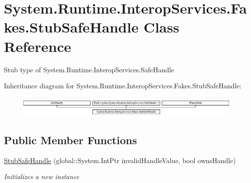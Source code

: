 \hypertarget{class_system_1_1_runtime_1_1_interop_services_1_1_fakes_1_1_stub_safe_handle}{\section{System.\-Runtime.\-Interop\-Services.\-Fakes.\-Stub\-Safe\-Handle Class Reference}
\label{class_system_1_1_runtime_1_1_interop_services_1_1_fakes_1_1_stub_safe_handle}
}


Stub type of System.\-Runtime.\-Interop\-Services.\-Safe\-Handle 


Inheritance diagram for System.\-Runtime.\-Interop\-Services.\-Fakes.\-Stub\-Safe\-Handle\-:\begin{figure}[H]
\begin{center}
\leavevmode
\includegraphics[height=1.034164cm]{class_system_1_1_runtime_1_1_interop_services_1_1_fakes_1_1_stub_safe_handle}
\end{center}
\end{figure}
\subsection*{Public Member Functions}
\begin{DoxyCompactItemize}
\item 
\hyperlink{class_system_1_1_runtime_1_1_interop_services_1_1_fakes_1_1_stub_safe_handle_ab5870e31b53bf154a114ab919807aab7}{Stub\-Safe\-Handle} (global\-::\-System.\-Int\-Ptr invalid\-Handle\-Value, bool owns\-Handle)
\begin{DoxyCompactList}\small\item\em Initializes a new instance\end{DoxyCompactList}\end{DoxyCompactItemize}
